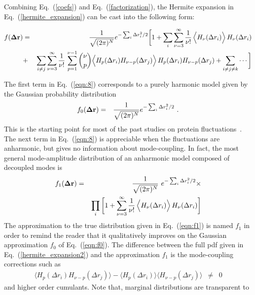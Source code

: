 \documentclass[12pt]{iopart}
\begin{document}
Combining Eq.~(\ref{coefs}) and Eq.~(\ref{factorization}), the Hermite
expansion in Eq.~(\ref{hermite_expansion}) can be cast into the
following form:
\begin{widetext}
\begin{eqnarray}
\label{hermite_expansion2}
f({\bf\Delta r}) &=& \frac{1}{\sqrt{(2\pi)^N}} e^{ -\sum_i \Delta
  r_i^2/2} \bigg[ 1 + \sum_i\sum_{\nu=3}^\infty
  \frac{1}{\nu!}\, \Big\langle
  H_\nu(\Delta r_i)\Big\rangle\,H_\nu(\Delta r_i) \nonumber \\
&+&  \sum_{i\ne j}\sum_{\nu=3}^\infty
  \frac{1}{\nu!}\,\sum_{p=1}^{\nu-1} {\nu\choose p} \Big\langle
  H_p(\Delta r_i)H_{\nu-p}(\Delta r_j)\Big\rangle\,H_p(\Delta r_i)H_{\nu-p}(\Delta r_j) + \sum_{i\ne j\ne k} \cdots \bigg]
\label{eqn:8}
\end{eqnarray}
\end{widetext}
The first term in Eq.~(\ref{eqn:8}) corresponds to a purely harmonic model given by
the Gaussian probability distribution
\begin{eqnarray}
\label{eqn:f0}
f_0({\bf\Delta r}) &=& \frac{1}{\sqrt{(2\pi)^N}} e^{ -\sum_i \Delta
  r_i^2/2}\ .
\end{eqnarray}
This is the starting point for most of the past studies on protein
fluctuations~\cite{cui2006normal}. The next term in Eq.~(\ref{eqn:8}) is
appreciable when the fluctuations are anharmonic, but gives no information
about mode-coupling. In fact, the most general mode-amplitude
distribution of an anharmonic model composed of decoupled modes is
\begin{eqnarray}
\label{eqn:f1}
f_1({\bf\Delta r}) &=& \frac{1}{\sqrt{(2\pi)^N}}\ e^{ -\sum_i \Delta
  r_i^2/2} \times \nonumber \\
&& \prod_i\bigg[ 1 + \sum_{\nu=3}^\infty
  \frac{1}{\nu!}\, \Big\langle
  H_\nu(\Delta r_i)\Big\rangle\,H_\nu(\Delta r_i)\bigg]
\end{eqnarray}
The approximation to the true distribution given in
Eq.~(\ref{eqn:f1}) is named $f_1$ in order to remind the reader
that it qualitatively improves on the Gaussian approximation $f_0$
of Eq.~(\ref{eqn:f0}). The difference between the full pdf given in
Eq.~(\ref{hermite_expansion2}) and the approximation $f_1$ is the
mode-coupling corrections such as
\begin{eqnarray}
\langle H_p(\Delta r_i)H_{\nu-p}(\Delta r_j)\rangle - \langle
H_p(\Delta r_i)\rangle\langle H_{\nu-p}(\Delta r_j)\rangle &\neq& 0 \nonumber
\end{eqnarray}
and higher order cumulants. Note that, marginal distributions are transparent to
\end{document}
